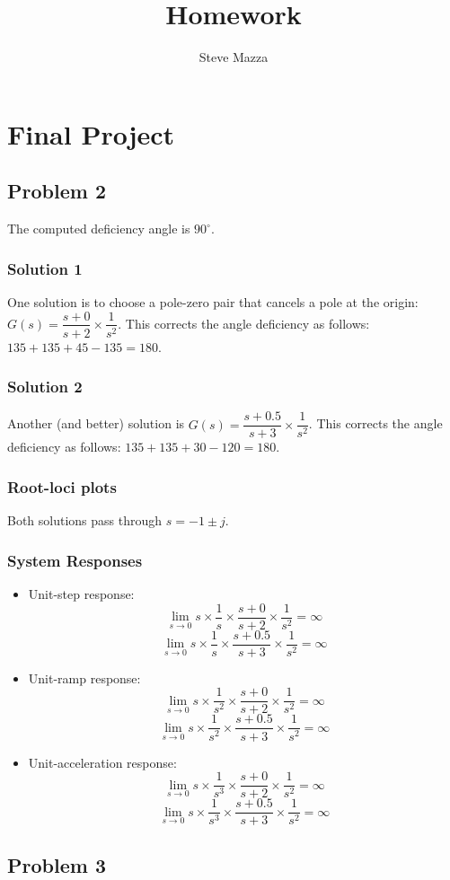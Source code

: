 \documentclass[letterpaper,10pt]{article}
\title{Homework}
\author{Steve Mazza}
\begin{document}
\maketitle

\section*{Final Project}
\subsection*{Problem 2}
The computed deficiency angle is $90^{\circ}$. 
\subsubsection*{Solution 1}
 One solution is to choose a pole-zero pair that cancels a pole at the origin: $G(s) = \dfrac{s+0}{s+2}\times\dfrac{1}{s^{2}}$.
This corrects the angle deficiency as follows: $135 + 135 + 45 - 135 = 180$.

\subsubsection*{Solution 2}
Another (and better) solution is $G(s) = \dfrac{s+0.5}{s+3}\times\dfrac{1}{s^{2}}$.
This corrects the angle deficiency as follows: $135+135+30-120=180$.

\subsubsection*{Root-loci plots}
Both solutions pass through $s=-1\pm j$.

\subsubsection*{System Responses}

\begin{itemize}
	\item Unit-step response: 
		\[\lim_{s\to 0} s\times\dfrac{1}{s}\times\dfrac{s+0}{s+2}\times\dfrac{1}{s^{2}}=\infty\]
		\[\lim_{s\to 0} s\times\dfrac{1}{s}\times\dfrac{s+0.5}{s+3}\times\dfrac{1}{s^{2}}=\infty\]
	\item Unit-ramp response: 
		\[\lim_{s\to 0} s\times\dfrac{1}{s^{2}}\times\dfrac{s+0}{s+2}\times\dfrac{1}{s^{2}}=\infty\]
		\[\lim_{s\to 0} s\times\dfrac{1}{s^{2}}\times\dfrac{s+0.5}{s+3}\times\dfrac{1}{s^{2}}=\infty\]
	\item Unit-acceleration response: 
		\[\lim_{s\to 0} s\times\dfrac{1}{s^{3}}\times\dfrac{s+0}{s+2}\times\dfrac{1}{s^{2}}=\infty\]
		\[\lim_{s\to 0} s\times\dfrac{1}{s^{3}}\times\dfrac{s+0.5}{s+3}\times\dfrac{1}{s^{2}}=\infty\]
\end{itemize}

\subsection*{Problem 3}
\end{document}
